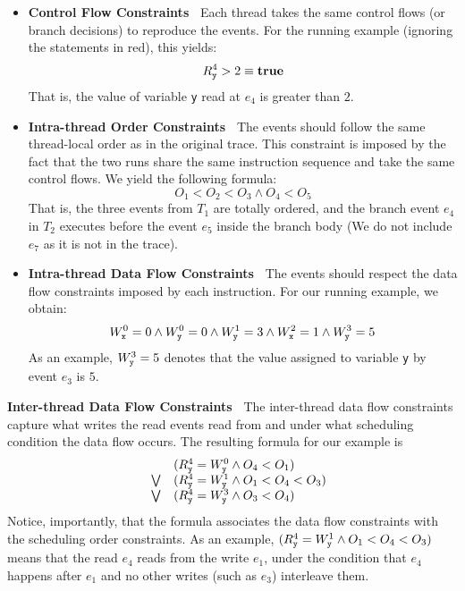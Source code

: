 \begin{itemize}
\item {\bf Control Flow Constraints\ } Each thread takes the same control flows (or branch decisions) to reproduce the events.
 For the running example (ignoring the statements in red), this yields:
$$
	R_{\tt y}^4 > 2 \equiv {\bf true}
$$
That is, the value of variable {\tt y} read at $e_4$ is greater than $2$. 


\item {\bf Intra-thread Order Constraints\ } The events should follow the same thread-local order as in the original trace. This constraint is imposed by the fact that the two runs share the same instruction sequence and take the same control flows. 
We yield the following formula:
$$
	O_1 < O_2 < O_3 \wedge O_4 < O_5
$$
That is, the three events from $T_1$ are totally ordered, and the branch event $e_4$ in $T_2$ executes before the event $e_5$ inside the branch body (We do not include $e_7$ as it is not in the trace).

\item {\bf Intra-thread Data Flow Constraints\ } The events should respect the data flow constraints imposed by each instruction.
 For our running example, we obtain:
$$
	W_{\tt x}^0 = 0 \wedge W_{\tt y}^0 = 0 \wedge W_{\tt y}^1 = 3 \wedge
			W_{\tt x}^2 = 1 \wedge W_{\tt y}^3 = 5
$$
As an example, $W_{\tt y}^3= 5$ denotes that the value assigned to variable {\tt y}  by event $e_3$ is $5$.
\end{itemize}





{\bf Inter-thread Data Flow Constraints\ } The inter-thread data flow constraints capture what writes the read events read from and under what scheduling condition the data flow occurs.  The resulting formula for our example is
$$
\begin{array}{lcl}
	& & (R_{\tt y}^4=W_{\tt y}^0 \wedge O_4 < O_1)  \\
& \bigvee &
	(R_{\tt y}^4=W_{\tt y}^1 \wedge O_1 < O_4 < O_3) \\
& \bigvee &
	(R_{\tt y}^4=W_{\tt y}^3 \wedge O_3 < O_4)
\end{array}
$$    
Notice, importantly, that the formula associates the data flow constraints with the scheduling order constraints. 
 As an example, 
$(R_{\tt y}^4=W_{\tt y}^1 \wedge O_1 < O_4 < O_3)$ means that the read $e_4$ reads from the write $e_1$, under the condition that $e_4$ happens after $e_1$ and no other     writes (such as $e_3$) interleave them.



